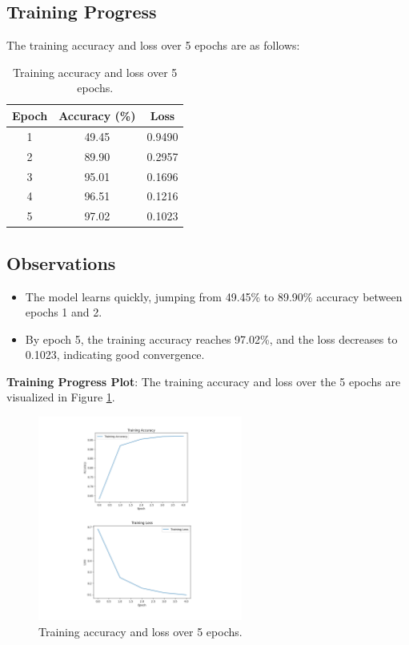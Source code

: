 \documentclass[a4paper,12pt]{article}
\begin{document}
\subsection{Training Progress}
The training accuracy and loss over 5 epochs are as follows:
\begin{table}[h]
    \centering
    \begin{tabular}{ccc}
        \toprule
        \textbf{Epoch} & \textbf{Accuracy (\%)} & \textbf{Loss} \\
        \midrule
        1 & 49.45 & 0.9490 \\
        2 & 89.90 & 0.2957 \\
        3 & 95.01 & 0.1696 \\
        4 & 96.51 & 0.1216 \\
        5 & 97.02 & 0.1023 \\
        \bottomrule
    \end{tabular}
    \caption{Training accuracy and loss over 5 epochs.}
    \label{tab:training_progress}
\end{table}

\subsection{Observations}
\begin{itemize}
    \item The model learns quickly, jumping from 49.45\% to 89.90\% accuracy between epochs 1 and 2.
    \item By epoch 5, the training accuracy reaches 97.02\%, and the loss decreases to 0.1023, indicating good convergence.
\end{itemize}

\textbf{Training Progress Plot}: The training accuracy and loss over the 5 epochs are visualized in Figure \ref{fig:training_progress}.
\begin{figure}[h]
    \centering
    \includegraphics[width=0.6\textwidth]{training_progress}
    \caption{Training accuracy and loss over 5 epochs.}
    \label{fig:training_progress}
\end{figure}
\end{document}
